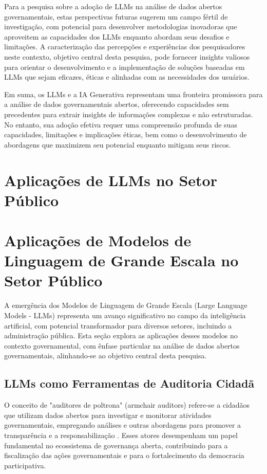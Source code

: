 Para a pesquisa sobre a adoção de LLMs na análise de dados abertos governamentais, estas perspectivas futuras sugerem um campo fértil de investigação, com potencial para desenvolver metodologias inovadoras que aproveitem as capacidades dos LLMs enquanto abordam seus desafios e limitações. A caracterização das percepções e experiências dos pesquisadores neste contexto, objetivo central desta pesquisa, pode fornecer insights valiosos para orientar o desenvolvimento e a implementação de soluções baseadas em LLMs que sejam eficazes, éticas e alinhadas com as necessidades dos usuários.

Em suma, os LLMs e a IA Generativa representam uma fronteira promissora para a análise de dados governamentais abertos, oferecendo capacidades sem precedentes para extrair insights de informações complexas e não estruturadas. No entanto, sua adoção efetiva requer uma compreensão profunda de suas capacidades, limitações e implicações éticas, bem como o desenvolvimento de abordagens que maximizem seu potencial enquanto mitigam seus riscos.


\section{Aplicações de LLMs no Setor Público}
\section{Aplicações de Modelos de Linguagem de Grande Escala no Setor Público}

A emergência dos Modelos de Linguagem de Grande Escala (Large Language Models - LLMs) representa um avanço significativo no campo da inteligência artificial, com potencial transformador para diversos setores, incluindo a administração pública. Esta seção explora as aplicações desses modelos no contexto governamental, com ênfase particular na análise de dados abertos governamentais, alinhando-se ao objetivo central desta pesquisa.

\subsection{LLMs como Ferramentas de Auditoria Cidadã}

O conceito de "auditores de poltrona" (armchair auditors) refere-se a cidadãos que utilizam dados abertos para investigar e monitorar atividades governamentais, empregando análises e outras abordagens para promover a transparência e a responsabilização \cite{ref_5}. Esses atores desempenham um papel fundamental no ecossistema de governança aberta, contribuindo para a fiscalização das ações governamentais e para o fortalecimento da democracia participativa.

